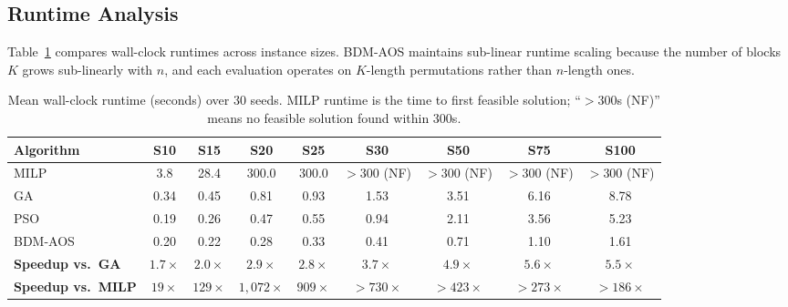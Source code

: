 \subsection{Runtime Analysis}

Table~\ref{tab:runtime} compares wall-clock runtimes across instance sizes.
BDM-AOS maintains sub-linear runtime scaling because the number of blocks $K$ grows sub-linearly with $n$, and each evaluation operates on $K$-length permutations rather than $n$-length ones.

\begin{table}[h]
\centering
\caption{Mean wall-clock runtime (seconds) over 30 seeds. MILP runtime is the time to first feasible solution; ``$>$300s (NF)'' means no feasible solution found within 300s.}
\label{tab:runtime}
\small
\begin{tabular}{lcccccccc}
\toprule
\textbf{Algorithm} & \textbf{S10} & \textbf{S15} & \textbf{S20} & \textbf{S25} & \textbf{S30} & \textbf{S50} & \textbf{S75} & \textbf{S100} \\
\midrule
MILP     & 3.8  & 28.4 & 300.0 & 300.0 & $>$300 (NF) & $>$300 (NF) & $>$300 (NF) & $>$300 (NF) \\
GA       & 0.34 & 0.45 & 0.81  & 0.93  & 1.53  & 3.51  & 6.16  & 8.78  \\
PSO      & 0.19 & 0.26 & 0.47  & 0.55  & 0.94  & 2.11  & 3.56  & 5.23  \\
BDM-AOS  & 0.20 & 0.22 & 0.28  & 0.33  & 0.41  & 0.71  & 1.10  & 1.61  \\
\midrule
\textbf{Speedup vs.\ GA}    & $1.7\times$ & $2.0\times$ & $2.9\times$ & $2.8\times$ & $3.7\times$ & $4.9\times$ & $5.6\times$ & $\mathbf{5.5\times}$ \\
\textbf{Speedup vs.\ MILP}  & $19\times$  & $129\times$ & $1{,}072\times$ & $909\times$ & $>\!730\times$ & $>\!423\times$ & $>\!273\times$ & $>\!186\times$ \\
\bottomrule
\end{tabular}
\end{table}
